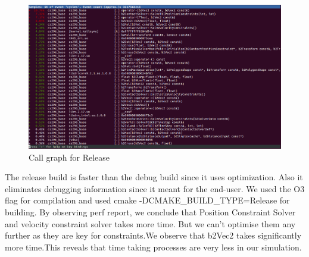 \documentclass[11pt]{article}
\begin{document}
\begin{figure}[ht!]
\centering
\includegraphics[width=150mm]{release.png}
\caption{Call graph for Release}
\label{overflow}
\end{figure}

The release build is faster than the debug build since it uses optimization. Also it eliminates debugging information since it meant for the end-user. We used the O3 flag for compilation and used cmake -DCMAKE\_BUILD\_TYPE=Release for building.
By observing perf report, we conclude that Position Constraint Solver and velocity constraint solver takes more time. But we can't optimise them any further as they are key for constraints.We observe that b2Vec2 takes significantly more time.This reveals that time taking processes are very less in our simulation. 
\end{document}
